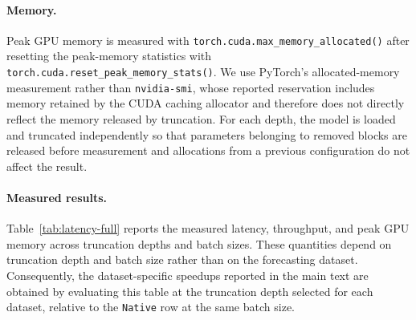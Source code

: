\paragraph{Memory.}
Peak GPU memory is measured with \texttt{torch.cuda.max\_memory\_allocated()} after resetting the peak-memory statistics with \texttt{torch.cuda.reset\_peak\_memory\_stats()}. We use PyTorch's allocated-memory measurement rather than \texttt{nvidia-smi}, whose reported reservation includes memory retained by the CUDA caching allocator and therefore does not directly reflect the memory released by truncation. For each depth, the model is loaded and truncated independently so that parameters belonging to removed blocks are released before measurement and allocations from a previous configuration do not affect the result.

\paragraph{Measured results.}
Table~\ref{tab:latency-full} reports the measured latency, throughput, and peak GPU memory across truncation depths and batch sizes. These quantities depend on truncation depth and batch size rather than on the forecasting dataset. Consequently, the dataset-specific speedups reported in the main text are obtained by evaluating this table at the truncation depth selected for each dataset, relative to the \texttt{Native} row at the same batch size.

